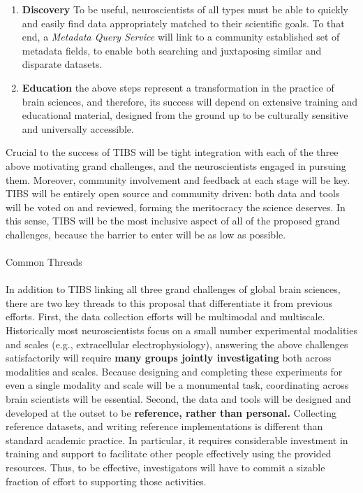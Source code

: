 \documentclass{amsart}
\begin{document}
\begin{enumerate}[1.]
  \item {\bf Discovery} To be useful, neuroscientists of all types must
    be able to quickly and easily find data appropriately matched to
    their scientific goals. To that end, a \textit{Metadata Query
    Service} will link to a community established set of metadata fields, 
    to enable both searching and juxtaposing similar and disparate
    datasets. \\ 
    
  \item {\bf Education} the above steps represent a transformation in
    the practice of brain sciences, and therefore, its success will
    depend on extensive training and educational material, designed from
    the ground up to be culturally sensitive and universally accessible.
\end{enumerate}



Crucial to the success of TIBS will be tight integration with each of the
three above motivating grand challenges, and the neuroscientists engaged
in pursuing them. Moreover, community involvement and feedback at each
stage will be key. TIBS will be entirely open source and community
driven: both data and tools will be voted on and reviewed, forming the
meritocracy the science deserves. In this sense, TIBS will be the most
inclusive aspect of all of the proposed grand challenges, because the
barrier to enter will be as low as possible. \\ \\ 


Common Threads \\ \\ 


In addition to TIBS linking all three grand challenges of global brain
sciences, there are two key threads to this proposal that differentiate
it from previous efforts. First, the data collection efforts will be
multimodal and multiscale. Historically most neuroscientists focus on a
small number experimental modalities and scales (e.g., extracellular
electrophysiology), answering the above challenges satisfactorily will
require {\bf many groups jointly investigating} both across modalities and
scales. Because designing and completing these experiments for even a
single modality and scale will be a monumental task, coordinating across
brain scientists will be essential. Second, the data and tools will be
designed and developed at the outset to be {\bf reference, rather than
personal.} Collecting reference datasets, and writing reference
implementations is different than standard academic practice. In
particular, it requires considerable investment in training and support
to facilitate other people effectively using the provided resources.
Thus, to be effective, investigators will have to commit a sizable
fraction of effort to supporting those activities. \\ \\ 
\end{document}
